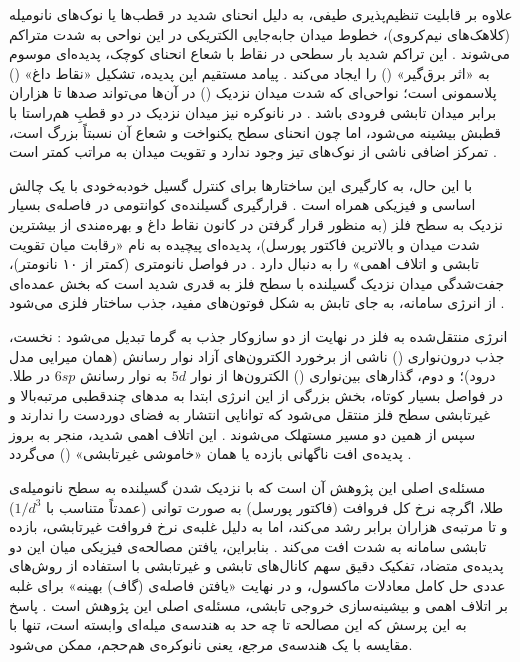 \documentclass[12pt,a4paper]{report}
\begin{document}
علاوه بر قابلیت تنظیم‌پذیری طیفی، به دلیل انحنای شدید در قطب‌ها یا نوک‌های نانومیله (کلاهک‌های نیم‌کروی)، خطوط میدان جابه‌جایی الکتریکی در این نواحی به شدت متراکم می‌شوند \cite{maier,novotny}. این تراکم شدید بار سطحی در نقاط با شعاع انحنای کوچک، پدیده‌ای موسوم به «اثر برق‌گیر» () را ایجاد می‌کند \cite{novotny,bharadwaj}. پیامد مستقیم این پدیده، تشکیل «نقاط داغ» () پلاسمونی است؛ نواحی‌ای که شدت میدان نزدیک () در آن‌ها می‌تواند صدها تا هزاران برابر میدان تابشی فرودی باشد \cite{novotny,maier}. در نانوکره نیز میدان نزدیک در دو قطبِ هم‌راستا با قطبش بیشینه می‌شود، اما چون انحنای سطح یکنواخت و شعاع آن نسبتاً بزرگ است، تمرکز اضافی ناشی از نوک‌های تیز وجود ندارد و تقویت میدان به مراتب کمتر است \cite{bohren,maier}.

با این حال، به کارگیری این ساختارها برای کنترل گسیل خودبه‌خودی با یک چالش اساسی و فیزیکی همراه است \cite{novotny,anger}. قرارگیری گسیلنده‌ی کوانتومی در فاصله‌ی بسیار نزدیک به سطح فلز (به منظور قرار گرفتن در کانون نقاط داغ و بهره‌مندی از بیشترین شدت میدان و بالاترین فاکتور پورسل)، پدیده‌ای پیچیده به نام «رقابت میان تقویت تابشی و اتلاف اهمی» را به دنبال دارد \cite{novotny,maier}. در فواصل نانومتری (کمتر از ۱۰ نانومتر)، جفت‌شدگی میدان نزدیک گسیلنده با سطح فلز به قدری شدید است که بخش عمده‌ای از انرژی سامانه، به جای تابش به شکل فوتون‌های مفید، جذب ساختار فلزی می‌شود \cite{novotny,anger}.

انرژی منتقل‌شده به فلز در نهایت از دو سازوکار جذب به گرما تبدیل می‌شود \cite{maier,jc}: نخست، جذب درون‌نواری () ناشی از برخورد الکترون‌های آزاد نوار رسانش (همان میرایی مدل درود)؛ و دوم، گذارهای بین‌نواری () الکترون‌ها از نوار $5d$ به نوار رسانش $6sp$ در طلا. در فواصل بسیار کوتاه، بخش بزرگی از این انرژی ابتدا به مدهای چندقطبی مرتبه‌بالا و غیرتابشی سطح فلز منتقل می‌شود که توانایی انتشار به فضای دوردست را ندارند و سپس از همین دو مسیر مستهلک می‌شوند \cite{novotny,ruppin}. این اتلاف اهمی شدید، منجر به بروز پدیده‌ی افت ناگهانی بازده یا همان «خاموشی غیرتابشی» () می‌گردد \cite{novotny,anger}.

مسئله‌ی اصلی این پژوهش آن است که با نزدیک شدن گسیلنده به سطح نانومیله‌ی طلا، اگرچه نرخ کل فروافت (فاکتور پورسل) به صورت توانی (عمدتاً متناسب با $1/d^3$) و تا مرتبه‌ی هزاران برابر رشد می‌کند، اما به دلیل غلبه‌ی نرخ فروافت غیرتابشی، بازده تابشی سامانه به شدت افت می‌کند \cite{novotny,koenderink}. بنابراین، یافتن مصالحه‌ی فیزیکی میان این دو پدیده‌ی متضاد، تفکیک دقیق سهم کانال‌های تابشی و غیرتابشی با استفاده از روش‌های عددی حل کامل معادلات ماکسول، و در نهایت «یافتن فاصله‌ی (گاف) بهینه» برای غلبه بر اتلاف اهمی و بیشینه‌سازی خروجی تابشی، مسئله‌ی اصلی این پژوهش است \cite{novotny,maier}. پاسخ به این پرسش که این مصالحه تا چه حد به هندسه‌ی میله‌ای وابسته است، تنها با مقایسه با یک هندسه‌ی مرجع، یعنی نانوکره‌ی هم‌حجم، ممکن می‌شود.
\end{document}
